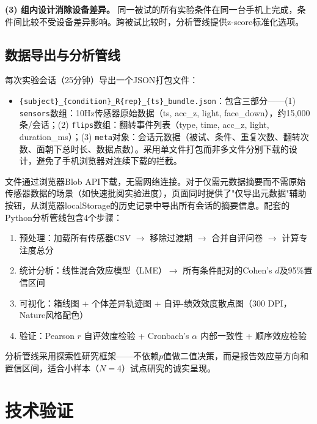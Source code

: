 \documentclass[12pt,a4paper]{ctexart}
\begin{document}
\textbf{(3) 组内设计消除设备差异。} 同一被试的所有实验条件在同一台手机上完成，条件间比较不受设备差异影响。跨被试比较时，分析管线提供z-score标准化选项。

\subsection{数据导出与分析管线}

每次实验会话（25分钟）导出一个JSON打包文件：

\begin{itemize}[leftmargin=*]
    \item \texttt{\{subject\}\_\{condition\}\_R\{rep\}\_\{ts\}\_bundle.json}：包含三部分——(1) \texttt{sensors}数组：10Hz传感器原始数据（ts, acc\_z, light, face\_down），约15,000条/会话；(2) \texttt{flips}数组：翻转事件列表（type, time, acc\_z, light, duration\_ms）；(3) \texttt{meta}对象：会话元数据（被试、条件、重复次数、翻转次数、面朝下总时长、数据点数）。采用单文件打包而非多文件分别下载的设计，避免了手机浏览器对连续下载的拦截。
\end{itemize}

文件通过浏览器Blob API下载，无需网络连接。对于仅需元数据摘要而不需原始传感器数据的场景（如快速批阅实验进度），页面同时提供了"仅导出元数据"辅助按钮，从浏览器localStorage的历史记录中导出所有会话的摘要信息。配套的Python分析管线包含4个步骤：

\begin{enumerate}[leftmargin=*,label=\textbf{步骤\arabic*：}]
    \item 预处理：加载所有传感器CSV $\rightarrow$ 移除过渡期 $\rightarrow$ 合并自评问卷 $\rightarrow$ 计算专注度总分
    \item 统计分析：线性混合效应模型（LME）$\rightarrow$ 所有条件配对的Cohen's $d$及95\%置信区间
    \item 可视化：箱线图 + 个体差异轨迹图 + 自评-绩效效度散点图（300 DPI，Nature风格配色）
    \item 验证：Pearson $r$ 自评效度检验 + Cronbach's $\alpha$ 内部一致性 + 顺序效应检验
\end{enumerate}

分析管线采用探索性研究框架——不依赖$p$值做二值决策，而是报告效应量方向和置信区间，适合小样本（$N=4$）试点研究的诚实呈现。

\section{技术验证}
\end{document}
